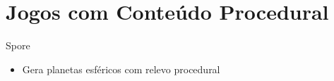\section{Jogos com Conteúdo Procedural}

\begin{frame}{Spore}
  \begin{itemize}
        \item Gera planetas esféricos com relevo procedural
    \end{itemize}
\end{frame}